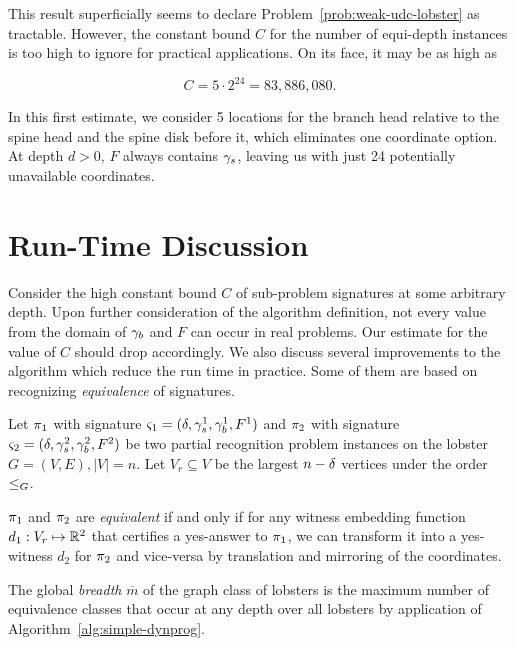 This result superficially seems to declare Problem~\ref{prob:weak-udc-lobster} as tractable. However, the constant bound $C$ for the number of equi-depth instances is too high to ignore for practical applications. On its face, it may be as high as

\begin{equation*}
    C = 5 \cdot 2^{24} = 83,886,080.
\end{equation*}

In this first estimate, we consider 5 locations for the branch head relative to the spine head and the spine disk before it, which eliminates one coordinate option. At depth $d>0$, $F$ always contains $\gamma_s$, leaving us with just 24 potentially unavailable coordinates.

\section{Run-Time Discussion}

Consider the high constant bound $C$ of sub-problem signatures at some arbitrary depth. Upon further consideration of the algorithm definition, not every value from the domain of $\gamma_b$ and $F$ can occur in real problems. Our estimate for the value of $C$ should drop accordingly. We also discuss several improvements to the algorithm which reduce the run time in practice. Some of them are based on recognizing \emph{equivalence} of signatures.

Let $\pi_1$ with signature $\varsigma_1 = (\delta, \gamma_s^1, \gamma_b^1, F^1)$ and $\pi_2$ with signature $\varsigma_2 = (\delta, \gamma_s^2, \gamma_b^2, F^2)$ be two partial recognition problem instances on the lobster $G = (V, E), |V| = n$. Let $V_r \subseteq V$ be the largest $n-\delta$ vertices under the order $\leq_G$.

$\pi_1$ and $\pi_2$ are \emph{equivalent} if and only if for any witness embedding function $d_1: V_r \mapsto \mathbb R^2$ that certifies a yes-answer to $\pi_1$, we can transform it into a yes-witness $d_2$ for $\pi_2$ and vice-versa by translation and mirroring of the coordinates.

The global \emph{breadth} $\overline{m}$ of the graph class of lobsters is the maximum number of equivalence classes that occur at any depth over all lobsters by application of Algorithm~\ref{alg:simple-dynprog}.


